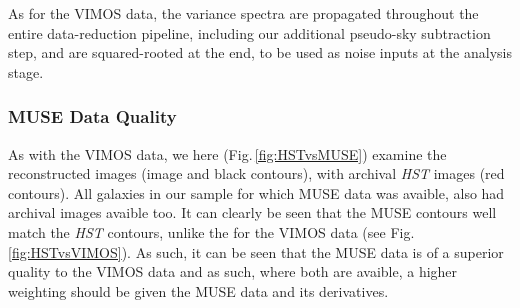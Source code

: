 		As for the VIMOS data, the variance spectra are propagated throughout the entire data-reduction pipeline, including our additional pseudo-sky subtraction step, and are squared-rooted at the end, to be used as noise inputs at the analysis stage. 

		\subsubsection{MUSE Data Quality}
			As with the VIMOS data, we here (Fig.\,\ref{fig:HSTvsMUSE}) examine the reconstructed images (image and black contours), with archival \textit{HST} images (red contours). All galaxies in our sample for which MUSE data was avaible, also had archival  images avaible too. It can clearly be seen that the MUSE contours well match the \textit{HST} contours, unlike the for the VIMOS data (see Fig.\,\ref{fig:HSTvsVIMOS}). As such, it can be seen that the MUSE data is of a superior quality to the VIMOS data and as such, where both are avaible, a higher weighting should be given the MUSE data and its derivatives. 

